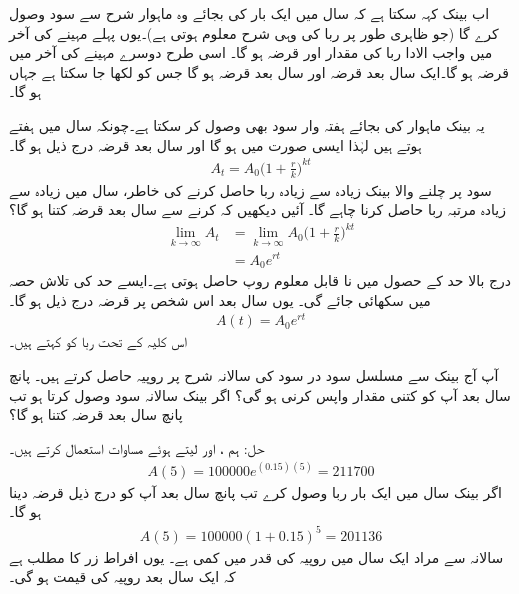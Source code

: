 اب بینک کہہ سکتا ہے کہ سال میں ایک بار کی بجائے وہ ماہوار  شرح سے سود وصول کرے  گا (جو ظاہری طور پر ربا کی وہی شرح معلوم ہوتی ہے)۔یوں پہلے مہینے کی آخر میں واجب الادا ربا کی مقدار  اور قرضہ  ہو گا۔ اسی طرح دوسرے مہینے کی آخر میں قرضہ  ہو گا۔ایک سال بعد قرضہ  اور  سال بعد قرضہ  ہو گا جس کو  لکھا جا سکتا ہے جہاں  ہو گا۔

یہ بینک ماہوار کی بجائے ہفتہ وار سود بھی وصول کر سکتا ہے۔چونکہ سال میں  ہفتے ہوتے ہیں لہٰذا ایسی صورت میں  ہو گا اور  سال بعد قرضہ درج ذیل ہو گا۔
\begin{align*}
A_t=A_0\big(1+\frac{r}{k}\big)^{kt}
\end{align*}
سود پر چلنے والا بینک زیادہ سے زیادہ ربا حاصل کرنے کی خاطر، سال میں  زیادہ سے زیادہ مرتبہ ربا حاصل کرنا چاہے گا۔ آئیں دیکھیں کہ  کرنے سے  سال بعد قرضہ کتنا ہو گا؟
\begin{align*}
\lim_{k\to \infty}A_t&=\lim_{k\to \infty} A_0\big(1+\frac{r}{k}\big)^{kt}\\
&=A_0e^{rt}
\end{align*}
درج بالا حد کے حصول میں نا قابل معلوم روپ  حاصل ہوتی ہے۔ایسے حد کی تلاش حصہ  میں سکھائی جائے گی۔ یوں  سال بعد اس شخص پر قرضہ درج ذیل ہو گا۔
\begin{align}\label{مساوات_ماورائی_سود_در_سود}
A(t)=A_0e^{rt}
\end{align}
اس کلیہ کے تحت ربا کو  کہتے ہیں۔

آپ آج بینک سے مسلسل سود در سود کی سالانہ  شرح پر  روپیہ حاصل کرتے ہیں۔ پانچ سال بعد آپ کو کتنی مقدار واپس کرنی ہو گی؟ اگر بینک سالانہ سود وصول کرتا ہو تب پانچ سال بعد قرضہ کتنا ہو گا؟

حل:\quad
ہم ،  اور  لیتے ہوئے مساوات  استعمال کرتے ہیں۔
\begin{align*}
A(5)=\num{100000}e^{(0.15)(5)}=\num{211700}
\end{align*}
اگر بینک سال میں ایک بار ربا وصول کرے تب پانچ سال بعد آپ کو درج ذیل قرضہ دینا ہو گا۔
\begin{align*}
A(5)=\num{100000}(1+0.15)^5=\num{201136}
\end{align*}
سالانہ  سے مراد ایک سال میں روپیہ کی قدر میں کمی ہے۔ یوں  افراط زر کا مطلب ہے کہ ایک سال بعد روپیہ کی قیمت  ہو گی۔

